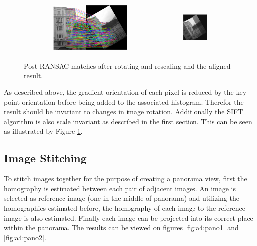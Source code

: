 \begin{figure}[h]
	\centering
	\begin{tabular}{cc}
	\includegraphics[width=0.59\textwidth]{figures/rotation_ransac.png} &
	\includegraphics[width=0.33\textwidth]{figures/rotation_overlay.png} 

	\end{tabular}
	\caption{Post RANSAC matches after rotating and rescaling and the aligned result.}
	\label{fig:a4:rotationscale}
\end{figure}

\FloatBarrier %

As described above, the gradient orientation of each pixel is reduced by the key point orientation before being added to the associated histogram. Therefor the result should be invariant to changes in image rotation. Additionally the SIFT algorithm is also scale invariant as described in the first section. This can be seen as illustrated by Figure \ref{fig:a4:rotationscale}.

\subsection{Image Stitching}

To stitch images together for the purpose of creating a panorama view, first the homography is estimated between each pair of adjacent images. An image is selected as reference image (one in the middle of panorama) and utilizing the homographies estimated before, the homography of each image to the reference image is also estimated. Finally each image can be projected into its correct place within the panorama. The results can be viewed on figures \ref{fig:a4:pano1} and \ref{fig:a4:pano2}.

